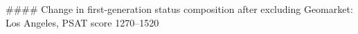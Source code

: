 #### Change in first-generation status composition after excluding Geomarket: Los Angeles, PSAT score 1270–1520
